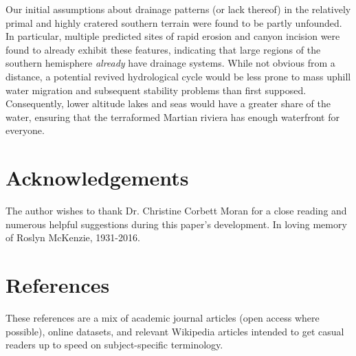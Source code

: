 \documentclass[12pt]{iopart}
\numberwithin{equation}{section}
\begin{document}
Our initial assumptions about drainage patterns (or lack thereof) in the relatively primal and highly cratered southern terrain were found to be partly unfounded. In particular, multiple predicted sites of rapid erosion and canyon incision were found to already exhibit these features, indicating that large regions of the southern hemisphere {\it already} have drainage systems. While not obvious from a distance, a potential revived hydrological cycle would be less prone to mass uphill water migration and subsequent stability problems than first supposed. Consequently, lower altitude lakes and seas would have a greater share of the water, ensuring that the terraformed Martian riviera has enough waterfront for everyone.

\section{Acknowledgements}
The author wishes to thank Dr. Christine Corbett Moran for a close reading and numerous helpful suggestions during this paper's development. In loving memory of Roslyn McKenzie, 1931-2016.

\section*{References}
These references are a mix of academic journal articles (open access where possible), online datasets, and relevant Wikipedia articles intended to get casual readers up to speed on subject-specific terminology.
\\
\end{document}
